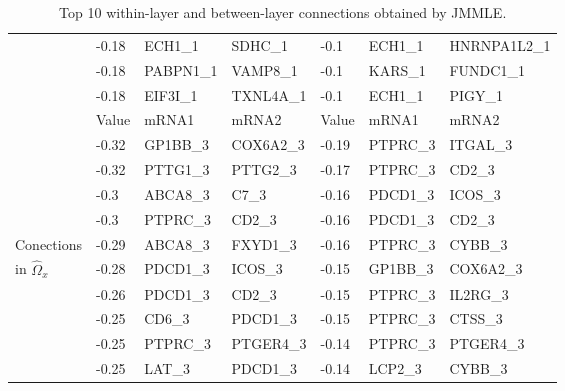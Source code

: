 \begin{table}[t!]
\begin{tabular}{l|lll|lll}
    ~ & -0.18 & ECH1\_1    & SDHC\_1   & -0.1  & ECH1\_1  & HNRNPA1L2\_1 \\
    ~ & -0.18 & PABPN1\_1  & VAMP8\_1  & -0.1  & KARS\_1  & FUNDC1\_1    \\
    ~ & -0.18 & EIF3I\_1   & TXNL4A\_1 & -0.1  & ECH1\_1  & PIGY\_1      \\ \hline
    \hline
    ~ & Value &    mRNA1 & mRNA2     & Value & mRNA1    & mRNA2     \\\cline{2-7}
    ~ & -0.32 & GP1BB\_3 & COX6A2\_3 & -0.19 & PTPRC\_3 & ITGAL\_3  \\
    ~ & -0.32 & PTTG1\_3 & PTTG2\_3  & -0.17 & PTPRC\_3 & CD2\_3    \\
    ~ & -0.3  & ABCA8\_3 & C7\_3     & -0.16 & PDCD1\_3 & ICOS\_3   \\
    ~ & -0.3  & PTPRC\_3 & CD2\_3    & -0.16 & PDCD1\_3 & CD2\_3    \\
Conections & -0.29 & ABCA8\_3 & FXYD1\_3  & -0.16 & PTPRC\_3 & CYBB\_3   \\
in $\widehat \Omega_x$ & -0.28 & PDCD1\_3 & ICOS\_3   & -0.15 & GP1BB\_3 & COX6A2\_3 \\
    ~ & -0.26 & PDCD1\_3 & CD2\_3    & -0.15 & PTPRC\_3 & IL2RG\_3  \\
    ~ & -0.25 & CD6\_3   & PDCD1\_3  & -0.15 & PTPRC\_3 & CTSS\_3   \\
    ~ & -0.25 & PTPRC\_3 & PTGER4\_3 & -0.14 & PTPRC\_3 & PTGER4\_3 \\
    ~ & -0.25 & LAT\_3   & PDCD1\_3  & -0.14 & LCP2\_3  & CYBB\_3   \\ \hline
    \end{tabular}
\caption{Top 10 within-layer and between-layer connections obtained by JMMLE.}
\label{table:top10}
\end{table}

